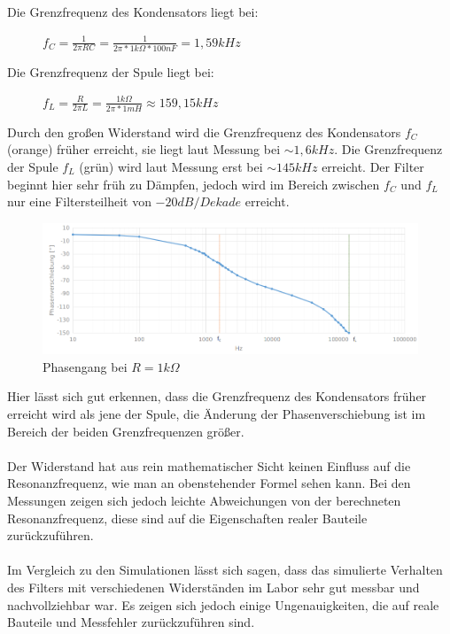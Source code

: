 \documentclass[12pt,a4paper,titlepage]{article}
\begin{document}
\noindent Die Grenzfrequenz des Kondensators liegt bei:
\begin{figure}[H]
  \centering
  $f_C = \frac{1}{2\pi RC} = \frac{1}{2\pi *1k\Omega*100nF} = 1,59kHz$
\end{figure}

\noindent Die Grenzfrequenz der Spule liegt bei:
\begin{figure}[H]
  \centering
$f_L = \frac{R}{2\pi L} = \frac{1k\Omega}{2\pi *1mH} \approx 159,15kHz$
\end{figure}

\noindent Durch den großen Widerstand wird die Grenzfrequenz des Kondensators $f_C$ (orange) früher erreicht, sie liegt laut Messung bei $\sim1,6kHz$. Die Grenzfrequenz der Spule $f_L$ (gr\"un) wird laut Messung erst bei $\sim145kHz$ erreicht. Der Filter beginnt hier sehr früh zu Dämpfen, jedoch wird im Bereich zwischen $f_C$ und $f_L$ nur eine Filtersteilheit von $-20dB/Dekade$ erreicht.

\begin{figure}[H]
  \centering
  \includegraphics[width=150mm]{phasengang_rlc_1k.png}
  \caption{Phasengang bei $R=1k\Omega$}
\end{figure}

\noindent Hier l\"asst sich gut erkennen, dass die Grenzfrequenz des Kondensators fr\"uher erreicht wird als jene der Spule, die Änderung der Phasenverschiebung ist im Bereich der beiden Grenzfrequenzen gr\"oßer.\\\\

\noindent Der Widerstand hat aus rein mathematischer Sicht keinen Einfluss auf die Resonanzfrequenz, wie man an obenstehender Formel sehen kann. Bei den Messungen zeigen sich jedoch leichte Abweichungen von der berechneten Resonanzfrequenz, diese sind auf die Eigenschaften realer Bauteile zurückzuführen.\\\\

\noindent Im Vergleich zu den Simulationen lässt sich sagen, dass das simulierte Verhalten des Filters mit verschiedenen Widerständen im Labor sehr gut messbar und nachvollziehbar war. Es zeigen sich jedoch einige Ungenauigkeiten, die auf reale Bauteile und Messfehler zurückzuführen sind.\\\\
\end{document}
